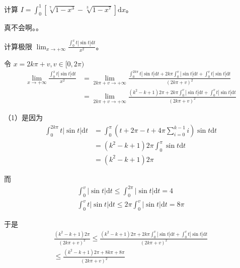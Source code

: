\begin{ques}
	计算 $\displaystyle I=\int _{0}^{1}\left[\sqrt[7]{1-x^{3}} -\sqrt[3]{1-x^{7}}\right]\mathrm{d} x$。
\end{ques}

真不会啊。。







\begin{ques}
	计算极限 $\displaystyle \lim _{x\rightarrow +\infty }\frac{\int _{0}^{x} t|\sin t|\mathrm{d} t}{x^{2}}$。
\end{ques}



令 $\displaystyle x=2k\pi +v,v\in [ 0,2\pi )$
\begin{align*}
	\lim _{x\rightarrow +\infty }\frac{\int _{0}^{x} t|\sin t|\mathrm{d} t}{x^{2}} & =\lim _{2k\pi +v\rightarrow +\infty }\frac{\int _{0}^{2k\pi } t|\sin t|\mathrm{d} t+2k\pi \int _{0}^{v} |\sin t|\mathrm{d} t+\int _{0}^{v} t|\sin t|\mathrm{d} t}{( 2k\pi +v)^{2}}\\
	& =\lim _{2k\pi +v\rightarrow +\infty }\frac{\left( k^{2} -k+1\right) 2\pi +2k\pi \int _{0}^{v} |\sin t|\mathrm{d} t+\int _{0}^{v} t|\sin t|\mathrm{d} t}{( 2k\pi +v)^{2}}
\end{align*}

（1）是因为
\begin{align*}
	\int _{0}^{2k\pi } t|\sin t|\mathrm{d} t & =\int _{0}^{\pi }\left( t+2\pi -t+4\pi \sum _{i=0}^{k-1} i\right)\sin t\mathrm{d} t\\
	& =\left( k^{2} -k+1\right) 2\pi \int _{0}^{\pi }\sin t\mathrm{d} t\\
	& =\left( k^{2} -k+1\right) 2\pi 
\end{align*}

而 
\begin{gather*}
	\int _{0}^{v} |\sin t|\mathrm{d} t\leqslant \int _{0}^{2\pi } |\sin t|\mathrm{d} t=4\\
	\int _{0}^{v} t|\sin t|\mathrm{d} t\leqslant 2\pi \int _{0}^{v} |\sin t|\mathrm{d} t=8\pi 
\end{gather*}


于是
\begin{gather*}
	\frac{\left( k^{2} -k+1\right) 2\pi }{( 2k\pi +v)^{2}} \leqslant \frac{\left( k^{2} -k+1\right) 2\pi +2k\pi \int _{0}^{v} |\sin t|\mathrm{d} t+\int _{0}^{v} t|\sin t|\mathrm{d} t}{( 2k\pi +v)^{2}}\\
	\leqslant \frac{\left( k^{2} -k+1\right) 2\pi +8k\pi +8\pi }{( 2k\pi +v)^{2}}
\end{gather*}



